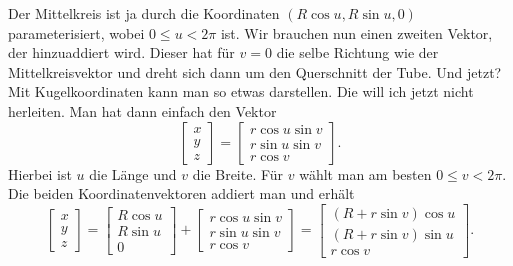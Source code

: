 \documentclass[a4paper,12pt,fleqn]{article}
\begin{document}
Der Mittelkreis ist ja durch die Koordinaten $(R\cos u,R\sin u,0)$
parameterisiert, wobei $0\le u<2\pi$ ist. Wir brauchen nun
einen zweiten Vektor, der hinzuaddiert wird. Dieser hat für $v=0$
die selbe Richtung wie der Mittelkreisvektor und dreht sich dann um
den Querschnitt der Tube. Und jetzt? Mit Kugelkoordinaten kann man
so etwas darstellen. Die will ich jetzt nicht herleiten. Man hat
dann einfach den Vektor
\begin{equation}
\begin{bmatrix}
x\\ y\\ z
\end{bmatrix}
= \begin{bmatrix}
r\cos u\sin v\\
r\sin u\sin v\\
r\cos v
\end{bmatrix}.
\end{equation}
Hierbei ist $u$ die Länge und $v$ die Breite. Für $v$ wählt man
am besten $0\le v<2\pi$. Die beiden Koordinatenvektoren addiert man
und erhält
\begin{equation}\label{Torus}
\begin{bmatrix}
x\\ y\\ z
\end{bmatrix}
= \begin{bmatrix}
R\cos u\\
R\sin u\\
0
\end{bmatrix}+\begin{bmatrix}
r\cos u\sin v\\
r\sin u\sin v\\
r\cos v
\end{bmatrix}
= \begin{bmatrix}
(R+r\sin v)\cos u\\
(R+r\sin v)\sin u\\
r\cos v
\end{bmatrix}.
\end{equation}
\end{document}
